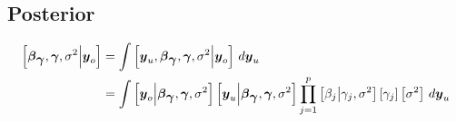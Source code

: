 \documentclass[fleqn]{article}
\def\bm#1{\mbox{\boldmath $#1$}}
\begin{document}
\subsection{Posterior}
%
\begin{align*}
%
\left[ \bm{\beta}_{\bm{\gamma}}, \bm{\gamma}, \sigma^2 \middle| \bm{y}_o \right] & = \int \left[ \bm{y}_u, \bm{\beta}_{\bm{\gamma}}, \bm{\gamma},  \sigma^2 \middle| \bm{y}_o \right] \,d \bm{y}_u\\
%
& = \int \left[ \bm{y}_{o} \middle| \bm{\beta}_{\bm{\gamma}}, \bm{\gamma}, \sigma^2 \right] \left[ \bm{y}_{u} \middle| \bm{\beta}_{\bm{\gamma}}, \bm{\gamma}, \sigma^2 \right] \prod_{j = 1}^p \left[ \beta_j \middle| \gamma_j, \sigma^2 \right] \left[ \gamma_j \right] \left[ \sigma^2 \right] \,d \bm{y}_u \\
%
\end{align*}
%
\end{document}

